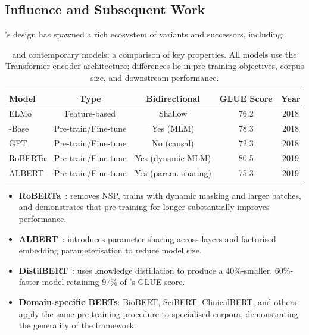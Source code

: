 \subsection{Influence and Subsequent Work}
\label{subsec:subsequent}

\bert{}'s design has spawned a rich ecosystem of variants and successors, including:
\begin{table}[H]
  \centering
  \caption{\bert{} and contemporary models: a comparison of key properties.
           All models use the Transformer encoder architecture; differences lie in
           pre-training objectives, corpus size, and downstream performance.}
  \label{tab:model_comparison}
  \renewcommand{\arraystretch}{1.3}
  \begin{tabular}{lcccc}
    \toprule
    \textbf{Model} & \textbf{Type} & \textbf{Bidirectional} & \textbf{GLUE Score} & \textbf{Year} \\
    \midrule
    ELMo & Feature-based & Shallow & 76.2 & 2018 \\
    \bert{}-Base & Pre-train/Fine-tune & Yes (MLM) & 78.3 & 2018 \\
    GPT & Pre-train/Fine-tune & No (causal) & 72.3 & 2018 \\
    RoBERTa & Pre-train/Fine-tune & Yes (dynamic MLM) & 80.5 & 2019 \\
    ALBERT & Pre-train/Fine-tune & Yes (param. sharing) & 75.3 & 2019 \\
    \bottomrule
  \end{tabular}
\end{table}
\begin{itemize}
  \item \textbf{RoBERTa}~\cite{liu2019roberta}: removes NSP, trains with dynamic
        masking and larger batches, and demonstrates that pre-training for longer
        substantially improves performance.
  \item \textbf{ALBERT}~\cite{lan2019albert}: introduces parameter sharing across
        layers and factorised embedding parameterisation to reduce model size.
  \item \textbf{DistilBERT}~\cite{sanh2019distilbert}: uses knowledge distillation
        to produce a 40\%-smaller, 60\%-faster model retaining 97\% of \bert{}'s
        GLUE score.
  \item \textbf{Domain-specific BERTs}: BioBERT, SciBERT, ClinicalBERT, and others
        apply the same pre-training procedure to specialised corpora, demonstrating
        the generality of the framework.
\end{itemize}

